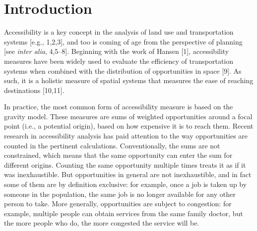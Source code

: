 \documentclass[10pt,letterpaper]{article}
\begin{document}

\linenumbers

\hypertarget{introduction}{%
\section{Introduction}\label{introduction}}

Accessibility is a key concept in the analysis of land use and
transportation systems {[}e.g., 1,2,3{]}, and too is coming of age from
the perspective of planning {[}see \emph{inter alia}, 4,5--8{]}.
Beginning with the work of Hansen {[}1{]}, accessibility measures have
been widely used to evaluate the efficiency of transportation systems
when combined with the distribution of opportunities in space {[}9{]}.
As such, it is a holistic measure of spatial systems that measures the
ease of reaching destinations {[}10,11{]}.

In practice, the most common form of accessibility measure is based on
the gravity model. These measures are sums of weighted opportunities
around a focal point (i.e., a potential origin), based on how expensive
it is to reach them. Recent research in accessibility analysis has paid
attention to the way opportunities are counted in the pertinent
calculations. Conventionally, the sums are not constrained, which means
that the same opportunity can enter the sum for different origins.
Counting the same opportunity multiple times treats it as if it was
inexhaustible. But opportunities in general are not inexhaustible, and
in fact some of them are by definition exclusive: for example, once a
job is taken up by someone in the population, the same job is no longer
available for any other person to take. More generally, opportunities
are subject to congestion: for example, multiple people can obtain
services from the same family doctor, but the more people who do, the
more congested the service will be.
\end{document}
